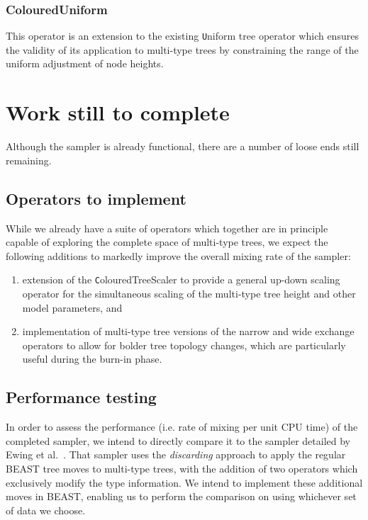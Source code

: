 \documentclass[a4paper,11pt]{article}
\newcommand{\class}[1]{{\texttt #1}}
\begin{document}
\subsubsection{ColouredUniform}

This operator is an extension to the existing \class{Uniform} tree
operator which ensures the validity of its application to multi-type
trees by constraining the range of the uniform adjustment of node
heights. 

\section{Work still to complete}

Although the sampler is already functional, there are a number of loose ends
still remaining.

\subsection{Operators to implement}

While we already have a suite of operators which together are in
principle capable of exploring the complete space of multi-type trees,
we expect the following additions to markedly improve the overall
mixing rate of the sampler:
\begin{enumerate}
\item extension of the \class{ColouredTreeScaler} to provide a general
  up-down scaling operator for the simultaneous scaling of the
  multi-type tree height and other model parameters, and
\item implementation of multi-type tree versions of the narrow and
  wide exchange operators to allow for bolder tree topology changes,
  which are particularly useful during the burn-in phase.
\end{enumerate}

\subsection{Performance testing}

In order to assess the performance (i.e. rate of mixing per unit CPU
time) of the completed sampler, we intend to directly compare it to
the sampler detailed by Ewing et al.~\cite{Ewing2004}.  That sampler
uses the \emph{discarding} approach to apply the regular BEAST tree
moves to multi-type trees, with the addition of two operators which
exclusively modify the type information.  We intend to implement these
additional moves in BEAST, enabling us to perform the comparison on
using whichever set of data we choose.
\end{document}
